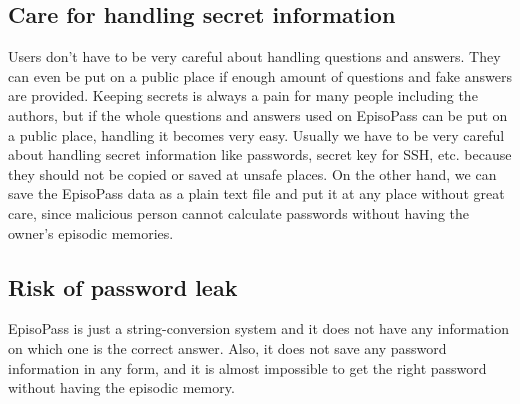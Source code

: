 \documentclass{sigchi}
\begin{document}
%
%


\subsection{Care for handling secret information}

Users don't have to be very careful about handling questions and answers.
They can even be put on a public place
if enough amount of questions and fake answers are provided.
%
Keeping secrets is always a pain for many people including
the authors, but if the whole questions and answers used on EpisoPass
can be put on a public place,
handling it becomes very easy.
Usually we have to be very careful about handling
secret information like passwords, secret key for SSH, etc.
because they should not be copied or saved at unsafe places.
On the other hand,
we can save the EpisoPass data as a plain text file and put it at
any place without great care, since malicious person cannot calculate
passwords without having the owner's episodic memories.

\subsection{Risk of password leak}

EpisoPass is just a string-conversion system and it does not
have any information on which one is the correct answer.
Also, it does not save any password information in any form, and
it is almost impossible to get the right password 
without having the episodic memory.

\end{document}
